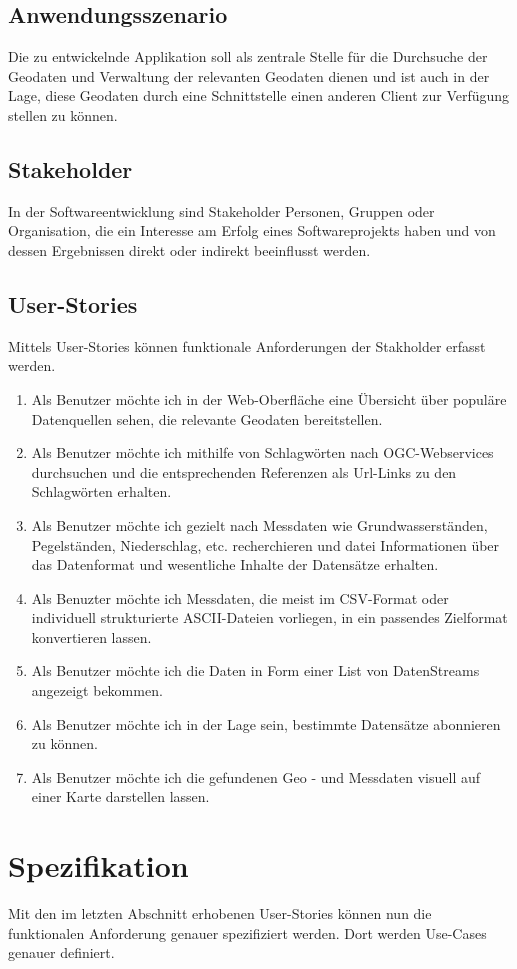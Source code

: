 \documentclass[a4paper,12pt]{scrreprt}
\begin{document}
\subsection{Anwendungsszenario}
Die zu entwickelnde Applikation soll als zentrale Stelle für die Durchsuche der Geodaten und Verwaltung der relevanten Geodaten dienen und ist auch in der Lage, diese Geodaten durch eine Schnittstelle einen anderen Client zur Verfügung stellen zu können.
\subsection{Stakeholder}
In der Softwareentwicklung sind Stakeholder Personen, Gruppen oder Organisation, die ein Interesse am Erfolg eines Softwareprojekts haben und von dessen Ergebnissen direkt oder indirekt beeinflusst werden.

\subsection{User-Stories}
Mittels User-Stories können funktionale Anforderungen der Stakholder erfasst werden.
\begin{enumerate}
\item Als Benutzer möchte ich in der Web-Oberfläche eine Übersicht über populäre Datenquellen sehen, die  relevante Geodaten bereitstellen.
\item Als Benutzer möchte ich mithilfe von Schlagwörten nach OGC-Webservices durchsuchen und die entsprechenden Referenzen als Url-Links zu den Schlagwörten erhalten.
\item Als Benutzer möchte ich gezielt nach Messdaten wie Grundwasserständen, Pegelständen, Niederschlag, etc. recherchieren und datei Informationen über das Datenformat und wesentliche Inhalte der Datensätze erhalten.
\item Als Benuzter möchte ich Messdaten, die meist im CSV-Format oder individuell strukturierte ASCII-Dateien vorliegen, in ein passendes Zielformat konvertieren lassen.
\item Als Benutzer möchte ich die Daten in Form einer List von DatenStreams angezeigt bekommen.
\item Als Benutzer möchte ich in der Lage sein, bestimmte Datensätze abonnieren zu können.
\item Als Benutzer möchte ich die gefundenen Geo - und Messdaten visuell auf einer Karte darstellen lassen.
\end{enumerate}

\section{Spezifikation}
Mit den im letzten Abschnitt erhobenen User-Stories können nun die funktionalen Anforderung genauer spezifiziert werden. Dort werden Use-Cases genauer definiert.
\end{document}
